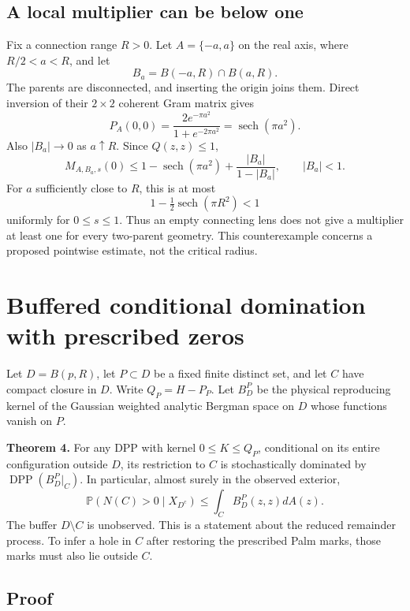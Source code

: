 \documentclass[11pt,a4paper]{article}
\theoremstyle{definition}
\theoremstyle{remark}
\numberwithin{equation}{section}
\begin{document}
\hypertarget{a-local-multiplier-can-be-below-one}{%
\subsection{A local multiplier can be below one}\label{a-local-multiplier-can-be-below-one}}

Fix a connection range \(R>0\). Let \(A=\{-a,a\}\) on the real axis, where \(R/2<a<R\), and let \[
B_a=B(-a,R)\cap B(a,R).
\] The parents are disconnected, and inserting the origin joins them. Direct inversion of their \(2\times2\) coherent Gram matrix gives \[
P_A(0,0)=\frac{2e^{-\pi a^2}}{1+e^{-2\pi a^2}}
=\operatorname{sech}(\pi a^2).
\] Also \(|B_a|\to0\) as \(a\uparrow R\). Since \(Q(z,z)\le1\), \[
M_{A,B_a,s}(0)
\le1-\operatorname{sech}(\pi a^2)
       +\frac{|B_a|}{1-|B_a|},\qquad |B_a|<1.
\] For \(a\) sufficiently close to \(R\), this is at most \[
1-\tfrac12\operatorname{sech}(\pi R^2)<1
\] uniformly for \(0\le s\le1\). Thus an empty connecting lens does not give a multiplier at least one for every two-parent geometry. This counterexample concerns a proposed pointwise estimate, not the critical radius.

\hypertarget{buffered-conditional-domination-with-prescribed-zeros}{%
\section{Buffered conditional domination with prescribed zeros}\label{buffered-conditional-domination-with-prescribed-zeros}}

Let \(D=B(p,R)\), let \(P\subset D\) be a fixed finite distinct set, and let \(C\) have compact closure in \(D\). Write \(Q_P=H-P_P\). Let \(B_D^P\) be the physical reproducing kernel of the Gaussian weighted analytic Bergman space on \(D\) whose functions vanish on \(P\).

\textbf{Theorem 4.} For any DPP with kernel \(0\le K\le Q_P\), conditional on its entire configuration outside \(D\), its restriction to \(C\) is stochastically dominated by \(\operatorname{DPP}(B_D^P|_C)\). In particular, almost surely in the observed exterior, \[
\mathbb P(N(C)>0\mid X_{D^c})
\le\int_C B_D^P(z,z)dA(z).
\tag{4.1}
\] The buffer \(D\setminus C\) is unobserved. This is a statement about the reduced remainder process. To infer a hole in \(C\) after restoring the prescribed Palm marks, those marks must also lie outside \(C\).

\hypertarget{proof-2}{%
\subsection{Proof}\label{proof-2}}
\end{document}
